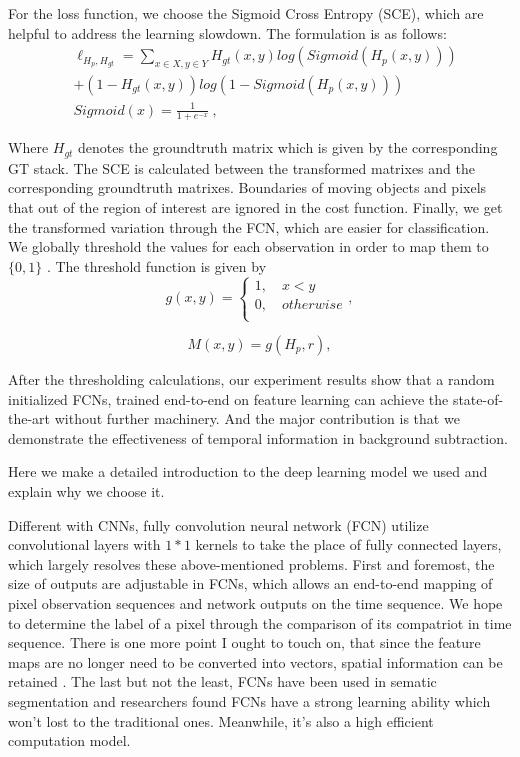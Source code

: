 \documentclass[journal]{IEEEtran}
\begin{document}
For the loss function, we choose the Sigmoid Cross Entropy (SCE), which are helpful to address the learning slowdown. 
The formulation is as follows:
\begin{equation}
    \begin{aligned}
        & \ell_{H_p, H_{gt}} =  \sum\limits_{x \in X, y \in Y}^{} H_{gt}(x,y) log(Sigmoid(H_p(x,y)))  \\
        & + (1 - H_{gt}(x,y)) log(1 - Sigmoid(H_p(x,y))) \\
        & Sigmoid(x) =\frac{1}{1+e^{-x}}\  ,
    \end{aligned}
\end{equation}

Where $H_{gt}$ denotes the groundtruth matrix which is given by the corresponding GT stack. 
The SCE is calculated between the transformed matrixes and the corresponding groundtruth matrixes. 
Boundaries of moving objects and pixels that out of the region of interest are ignored in the cost function.
Finally, we get the transformed variation through the FCN, which are easier for classification. 
We globally threshold the values for each observation in order to map them to $\{0,1\}$ . 
The threshold function is given by
\begin{equation}
    \label{piecewise_fg}
    g(x,y) =
 \begin{cases}
  1,  \quad x < y       \\
  0,  \quad otherwise   \\
\end{cases},
\end{equation}

\begin{equation}
M(x,y)=g(H_p,r) ,
\end{equation}

After the thresholding calculations, our experiment results show that a random initialized FCNs, trained end-to-end on feature learning can achieve the state-of-the-art without further machinery. 
And the major contribution is that we demonstrate the effectiveness of temporal information in background subtraction.

Here we make a detailed introduction to the deep learning model we used and explain why we choose it.

Different with CNNs, fully convolution neural network (FCN) utilize convolutional layers with $1*1$ kernels to take the place of fully connected layers, which largely resolves these above-mentioned problems. 
First and foremost, the size of outputs are adjustable in FCNs, which allows an end-to-end mapping of pixel observation sequences and network outputs on the time sequence. 
We hope to determine the label of a pixel through the comparison of its compatriot in time sequence. 
There is one more point I ought to touch on, that since the feature maps are no longer need to be converted into vectors, spatial information can be retained . 
The last but not the least, FCNs have been used in sematic segmentation and researchers found FCNs have a strong learning ability which won't lost to the traditional ones. 
Meanwhile, it's also a high efficient computation model. 
\end{document}
